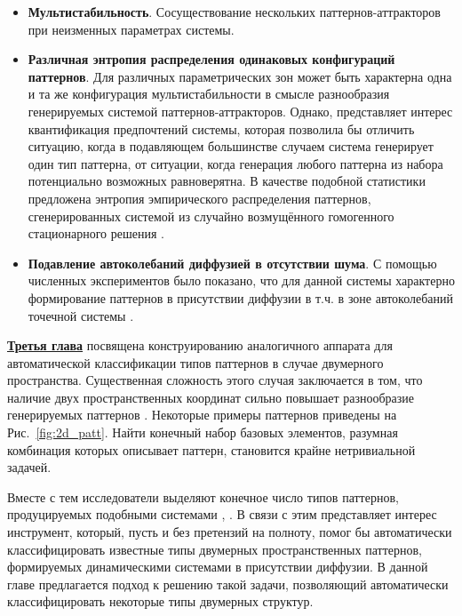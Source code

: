 \begin{itemize}
    \item \textbf{Мультистабильность}. Сосуществование нескольких паттернов-аттракторов при неизменных параметрах системы.
    \item \textbf{Различная энтропия распределения одинаковых конфигураций паттернов}. Для различных параметрических зон может быть характерна одна и та же конфигурация мультистабильности в смысле разнообразия генерируемых системой паттернов-аттракторов. Однако, представляет интерес квантификация предпочтений системы, которая позволила бы отличить ситуацию, когда в подавляющем большинстве случаем система генерирует один тип паттерна, от ситуации, когда генерация любого паттерна из набора потенциально возможных равноверятна. В качестве подобной статистики предложена энтропия \cite{shannon1948mathematical} эмпирического распределения паттернов, сгенерированных системой из случайно возмущённого гомогенного стационарного решения \cite{bib5}.
    \item \textbf{Подавление автоколебаний диффузией в отсутствии шума}. С помощью численных экспериментов было показано, что для данной системы характерно формирование паттернов в присутствии диффузии в т.ч. в зоне автоколебаний точечной системы \cite{bib5}.
\end{itemize}

\underline{\textbf{Третья глава}} посвящена конструированию аналогичного аппарата для автоматической классификации типов паттернов в случае двумерного пространства. Существенная сложность этого случая заключается в том, что наличие двух пространственных координат сильно повышает разнообразие генерируемых паттернов \cite{vanag2004waves}. Некоторые примеры паттернов приведены на Рис.~\ref{fig:2d_patt}. Найти конечный набор базовых элементов, разумная комбинация которых описывает паттерн, становится крайне нетривиальной задачей. 

\begin{figure}[ht]   
\end{figure}

Вместе с тем исследователи выделяют конечное число типов паттернов, продуцируемых подобными системами \cite{vanag2008book}, \cite{maini2019turing}. В связи с этим представляет интерес инструмент, который, пусть и без претензий на полноту, помог бы автоматически классифицировать известные типы двумерных пространственных паттернов, формируемых динамическими системами в присутствии диффузии. В данной главе предлагается подход к решению такой задачи, позволяющий автоматически классифицировать некоторые типы двумерных структур.



